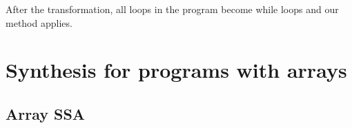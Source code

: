 \documentclass[12pt]{gatech-thesis}
\begin{document}
After the transformation, all loops in the program become while loops and our method applies.







\chapter{Synthesis for programs with arrays}


\newcommand{\Drawgraph}[2]{
	\begin{figure}[H]
	\centering
	\begin{tikzpicture} [auto, >=stealth', scale=.8]

	  \tikzstyle{array}=[rectangle, thick, minimum size=7mm, draw=black!75,font=\sffamily\small]
	  \tikzstyle{scalar}=[circle, thick, minimum size=7mm, draw=black!75,font=\sffamily\small]
	  \tikzstyle{op}=[circle, , draw=black!75, fill=gray!25, minimum size=2mm, font=\sffamily\tiny]
	   \tikzstyle{available}=[blue]
	    \tikzstyle{target}=[red]
	  
 	 \tikzstyle{lbl}=[font=\sffamily\tiny]
  
	 #1
	
	\end{tikzpicture}
	\caption{#2}
	\end{figure}
}




\section{Array SSA}
\end{document}
